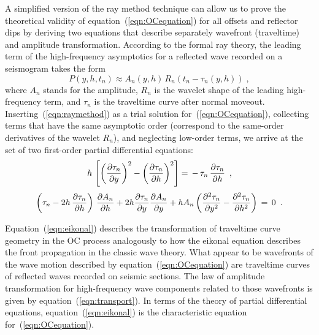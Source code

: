 A simplified version of the ray method technique \cite[]{cerveny,babich}
can allow us to prove the theoretical validity of
equation~(\ref{eqn:OCequation}) for all offsets and reflector dips by
deriving two equations that describe separately wavefront (traveltime)
and amplitude transformation.  According to the formal ray theory,
the leading term of the high-frequency asymptotics for a reflected
wave recorded on a seismogram takes the form
\begin{equation}
   P\left(y,h,t_n\right) \approx
A_n(y,h)\,R_n\left(t_n-\tau_n(y,h)\right) \;,
\label{eqn:raymethod} 
\end{equation}  
where $A_n$ stands for the amplitude, $R_n$ is the wavelet shape of
the leading high-frequency term, and $\tau_n$ is the traveltime curve
after normal moveout. Inserting~(\ref{eqn:raymethod}) as a trial
solution for~(\ref{eqn:OCequation}), collecting terms that have the
same asymptotic order (correspond to the same-order derivatives of the
wavelet $R_n$), and neglecting low-order terms, we arrive at the set of
two first-order partial differential equations:
\begin{equation}
h \, \left[     {\left( \partial \tau_n \over \partial y \right)}^2 - 
                {\left( \partial \tau_n \over \partial h \right)}^2
     \right] = \, - \, \tau_n \, {\partial \tau_n \over \partial h} \,\,\,,  
\label{eqn:eikonal} 
\end{equation}   
\begin{equation}
\left( \tau_n - 2h \, {\partial \tau_n \over {\partial h}} \right)
\, {\partial A_n \over \partial h} + 2h {\partial \tau_n \over \partial
y}   {\partial A_n \over \partial y} + h A_n \left( {\partial^2 \tau_n
\over {\partial y^2}} - {\partial^2 \tau_n \over {\partial h^2}} 
\right) \, = \, 0 \,\,\,.
\label{eqn:transport} 
\end{equation}

Equation~(\ref{eqn:eikonal}) describes the transformation of
traveltime curve geometry in the OC process analogously to how the
eikonal equation describes the front propagation in the classic wave
theory.  What appear to be wavefronts of the wave motion described by
equation~(\ref{eqn:OCequation}) are traveltime curves of reflected
waves recorded on seismic sections.  The law of amplitude
transformation for high-frequency wave components related to those
wavefronts is given by equation~(\ref{eqn:transport}).  In terms of
the theory of partial differential equations,
equation~(\ref{eqn:eikonal}) is the characteristic equation
for~(\ref{eqn:OCequation}).

